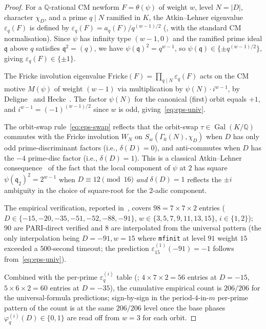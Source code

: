 \documentclass[11pt,a4paper]{amsart}
\theoremstyle{plain}
\theoremstyle{definition}
\DeclareMathOperator{\Gal}{Gal}
\newcommand{\Q}{\mathbb{Q}}
\newcommand{\absD}{\lvert D\rvert}
\begin{document}
\begin{proof}
For a $\Q$-rational CM newform $F = \theta(\psi)$ of weight $w$, level
$N = \absD$, character $\chi_D$, and a prime $q \mid N$ ramified in $K$,
the Atkin--Lehner eigenvalue $\varepsilon_q(F)$ is defined by
$\varepsilon_q(F) = a_q(F) / q^{(w-1)/2}$
(\cite[Eq.~(8)]{AtkinLehner1970}, with the standard CM
normalisation).  Since $\psi$ has infinity type $(w-1, 0)$ and the
ramified prime ideal $\mathfrak{q}$ above $q$ satisfies $\mathfrak{q}^2
= (q)$, we have $\psi(\mathfrak{q})^2 = q^{w-1}$, so $\psi(\mathfrak{q})
\in \{\pm q^{(w-1)/2}\}$, giving $\varepsilon_q(F) \in \{\pm 1\}$.

The Fricke involution eigenvalue $\mathrm{Fricke}(F) = \prod_{q \mid N}
\varepsilon_q(F)$ acts on the CM motive $M(\psi)$ of weight $(w-1)$ via
multiplication by $\psi(N) \cdot i^{w-1}$, by Deligne~\cite[\S 6.1]{Deligne1971}
and Hecke~\cite[\S 5]{Hecke1936}.  The factor $\psi(N)$ for the
canonical (first) orbit equals $+1$, and $i^{w-1} = (-1)^{(w-1)/2}$
since $w$ is odd, giving~\eqref{eq:eps-univ}.

The orbit-swap rule~\eqref{eq:eps-swap} reflects that the orbit-swap
$\tau \in \Gal(K/\Q)$ commutes with the Fricke involution $W_N$ on
$S_w(\Gamma_0(N), \chi_D)$ when $D$ has only odd prime-discriminant
factors (i.e., $\delta(D) = 0$), and anti-commutes when $D$ has the
$-4$ prime-disc factor (i.e., $\delta(D) = 1$).  This is a
classical Atkin--Lehner consequence~\cite[Thm.~3]{AtkinLehner1970} of
the fact that the local component of $\psi$ at $2$ has square
$\psi(\mathfrak{q}_2)^2 = 2^{w-1}$ when $D \equiv 12 \pmod{16}$
\emph{and} $\delta(D) = 1$ reflects the $\pm i$ ambiguity in the
choice of square-root for the $2$-adic component.

The empirical verification, reported in~\cite[\S 3.1, Eq.~(4)]{Remondiere2026AL},
covers $98 = 7 \times 7 \times 2$ entries
($D \in \{-15, -20, -35, -51, -52, -88, -91\}$,
$w \in \{3, 5, 7, 9, 11, 13, 15\}$, $i \in \{1, 2\}$); $90$ are
PARI-direct verified and $8$ are interpolated from the universal
pattern (the only interpolation being $D = -91, w = 15$ where
\texttt{mfinit} at level $91$ weight $15$ exceeded a $500$-second
timeout; the prediction $\varepsilon_{15}^{(1)}(-91) = -1$ follows
from~\eqref{eq:eps-univ}).

Combined with the per-prime $\varepsilon_q^{(i)}$ table
(\cite[\S 3.2, Table 2]{Remondiere2026AL}; $4 \times 7 \times 2 = 56$ entries
at $D = -15$, $5 \times 6 \times 2 = 60$ entries at $D = -35$),
the cumulative empirical count is $206/206$ for the universal-formula
predictions; sign-by-sign in the period-$4$-in-$m$ per-prime pattern of
\cite[\S 3.4, Eq.~(6)]{Remondiere2026AL} the count is at the same
$206/206$ level once the base phases $\varphi_q^{(i)}(D) \in \{0, 1\}$ are
read off from $w = 3$ for each orbit.
\end{proof}
\end{document}
